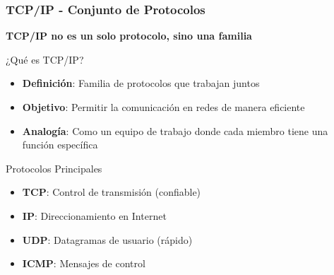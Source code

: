 \documentclass[aspectratio=169]{beamer}
\begin{document}
            \begin{frame}
            \frametitle{TCP/IP - Conjunto de Protocolos}
            
            \begin{center}
            \Large \textbf{TCP/IP no es un solo protocolo, sino una familia}
            \end{center}
            
            \begin{block}{¿Qué es TCP/IP?}
            \begin{itemize}
            \item \textbf{Definición}: Familia de protocolos que trabajan juntos
            \item \textbf{Objetivo}: Permitir la comunicación en redes de manera eficiente
            \item \textbf{Analogía}: Como un equipo de trabajo donde cada miembro tiene una función específica
            \end{itemize}
            \end{block}
            
         
            \begin{block}{Protocolos Principales}
            \begin{itemize}
            \item \textbf{TCP}: Control de transmisión (confiable)
            \item \textbf{IP}: Direccionamiento en Internet
            \item \textbf{UDP}: Datagramas de usuario (rápido)
            \item \textbf{ICMP}: Mensajes de control
            \end{itemize}
             \end{block}

          \end{frame}
            
\end{document}
